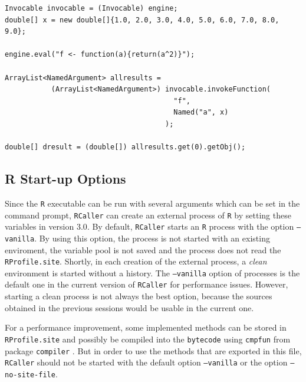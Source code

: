 \documentclass[10pt,a4paper, final, oneside]{article}
\begin{document}
\begin{minipage}{\linewidth}
\begin{lstlisting}[caption=Invoking user-defined functions,label=code_invoke_userfunction]
Invocable invocable = (Invocable) engine;
double[] x = new double[]{1.0, 2.0, 3.0, 4.0, 5.0, 6.0, 7.0, 8.0, 9.0};
        
engine.eval("f <- function(a){return(a^2)}");

ArrayList<NamedArgument> allresults = 
           (ArrayList<NamedArgument>) invocable.invokeFunction(
                                        "f", 
                                        Named("a", x)
                                      );
                                      
double[] dresult = (double[]) allresults.get(0).getObj();        
\end{lstlisting}
\end{minipage}
        
        
\subsection{R Start-up Options}
\label{sec:r_startup_options}
Since the \texttt{R} executable can be run with several arguments which can be set in the command prompt, \texttt{RCaller} can create an external process of \texttt{R} by setting these variables in version $3.0$. By default, \texttt{RCaller} starts an \texttt{R} process with the option \texttt{--vanilla}. By using this option, the process is not started with an existing enviroment, the variable pool is not saved and the process does not read the \texttt{RProfile.site}. Shortly, in each creation of the external process, a \textit{clean} environment is started without a history. The \texttt{--vanilla} option of processes is the default one in the current version of \texttt{RCaller} for performance issues. However, starting a clean process is not always the best option, because the sources obtained in the previous sessions would be usable in the current one.

For a performance improvement, some implemented methods can be stored in \texttt{RProfile.site} and possibly be compiled into the \texttt{bytecode} using \texttt{cmpfun} from package \texttt{compiler} \cite{lim2015r,tierney2001compiling}. But in order to use the methods that are exported in this file, \texttt{RCaller} should not be started with the default option \texttt{--vanilla} or the option \texttt{--no-site-file}. 
\end{document}
